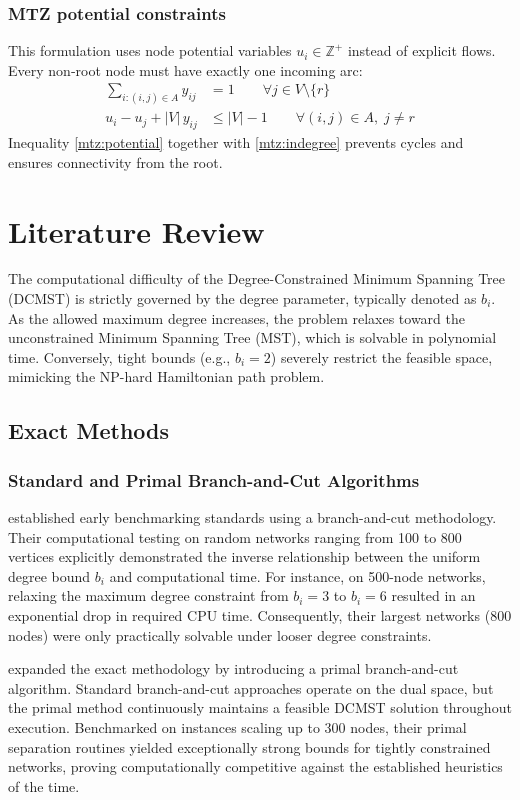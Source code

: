 \documentclass[12pt]{article}
\begin{document}
\subsubsection{MTZ potential constraints}
This formulation uses node potential variables $u_i \in \mathbb{Z}^+$ instead of explicit flows.  
Every non‑root node must have exactly one incoming arc:
\begin{align}
\sum_{i: (i,j) \in A} y_{ij} &= 1 \qquad \forall j \in V\setminus\{r\} \label{mtz:indegree} \\
u_i - u_j + |V|\, y_{ij} &\le |V|-1 \qquad \forall (i,j)\in A,\; j \neq r \label{mtz:potential}
\end{align}
Inequality \eqref{mtz:potential} together with \eqref{mtz:indegree} prevents cycles and ensures connectivity from the root.

\section{Literature Review}
The computational difficulty of the Degree-Constrained Minimum Spanning Tree (DCMST) is strictly governed by the degree parameter, typically denoted as $b_i$. As the allowed maximum degree increases, the problem relaxes toward the unconstrained Minimum Spanning Tree (MST), which is solvable in polynomial time. Conversely, tight bounds (e.g., $b_i = 2$) severely restrict the feasible space, mimicking the NP-hard Hamiltonian path problem.

\subsection{Exact Methods}

\subsubsection{Standard and Primal Branch-and-Cut Algorithms}
\citet{Caccetta2001} established early benchmarking standards using a branch-and-cut methodology. Their computational testing on random networks ranging from 100 to 800 vertices explicitly demonstrated the inverse relationship between the uniform degree bound $b_i$ and computational time. For instance, on 500-node networks, relaxing the maximum degree constraint from $b_i = 3$ to $b_i = 6$ resulted in an exponential drop in required CPU time. Consequently, their largest networks (800 nodes) were only practically solvable under looser degree constraints. 

\vspace{0.5cm}
\noindent \citet{Behle2007} expanded the exact methodology by introducing a primal branch-and-cut algorithm. Standard branch-and-cut approaches operate on the dual space, but the primal method continuously maintains a feasible DCMST solution throughout execution. Benchmarked on instances scaling up to 300 nodes, their primal separation routines yielded exceptionally strong bounds for tightly constrained networks, proving computationally competitive against the established heuristics of the time.
\end{document}
